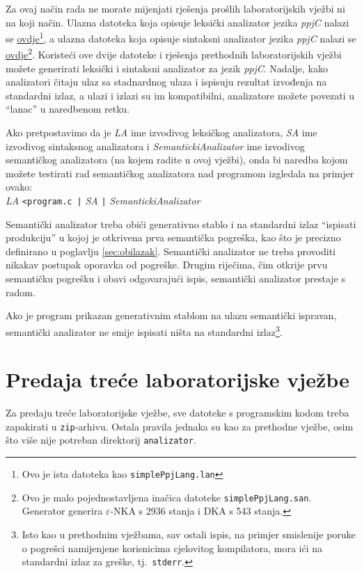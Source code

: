 \documentclass[times, 12pt, utf8]{book}
\begin{document}
Za ovaj način rada ne morate mijenjati rješenja prošlih laboratorijskih vježbi ni na koji način.
Ulazna datoteka koja opisuje leksički analizator jezika \emph{ppjC} nalazi se \href{https://github.com/fer-ppj/ppj-labosi/raw/master/res/lab3/ppjC.lan}{ovdje}\footnote{Ovo je ista datoteka kao \texttt{simplePpjLang.lan}}, a ulazna datoteka koja opisuje sintaksni analizator jezika \emph{ppjC} nalazi se \href{https://github.com/fer-ppj/ppj-labosi/raw/master/res/lab3/ppjC.san}{ovdje}\footnote{Ovo je malo pojednostavljena inačica datoteke \texttt{simplePpjLang.san}. Generator generira \(\varepsilon\)-NKA s 2936 stanja i DKA s 543 stanja.}.
Koristeći ove dvije datoteke i rješenja prethodnih laboratorijskih vježbi možete generirati leksički i sintaksni analizator za jezik \emph{ppjC}.
Nadalje, kako analizatori čitaju ulaz sa stadnardnog ulaza i ispisuju rezultat izvođenja na standardni izlaz, a ulazi i izlazi su im kompatibilni, analizatore možete povezati u ``lanac'' u naredbenom retku.

Ako pretpostavimo da je \emph{LA} ime izvodivog leksičkog analizatora, \emph{SA} ime izvodivog sintaksnog analizatora i \emph{SemantickiAnalizator} ime izvodivog semantičkog analizatora (na kojem radite u ovoj vježbi), onda bi naredba kojom možete testirati rad semantičkog analizatora nad programom izgledala na primjer ovako:\\
\emph{LA} \verb#<program.c |# \emph{SA} \verb#|# \emph{SemantickiAnalizator}

Semantički analizator treba obići generativno stablo i na standardni izlaz ``ispisati produkciju'' u kojoj je otkrivena prva semantička pogreška, kao što je precizno definirano u poglavlju \ref{sec:obilazak}.
Semantički analizator ne treba provoditi nikakav postupak oporavka od pogreške.
Drugim riječima, čim otkrije prvu semantičku pogrešku i obavi odgovarajući ispis, semantički analizator prestaje s radom.

Ako je program prikazan generativnim stablom na ulazu semantički ispravan, semantički analizator ne smije ispisati ništa na standardni izlaz\footnote{Isto kao u prethodnim vježbama, sav ostali ispis, na primjer smislenije poruke o pogrešci namijenjene korisnicima cjelovitog kompilatora, mora ići na standardni izlaz za greške, tj.~\texttt{stderr}.}.


\section{Predaja treće laboratorijske vježbe}
Za predaju treće laboratorijske vježbe, sve datoteke s programskim kodom treba zapakirati u \verb|zip|-arhivu.
Ostala pravila jednaka su kao za prethodne vježbe, osim što više nije potreban direktorij \verb|analizator|.
\end{document}
